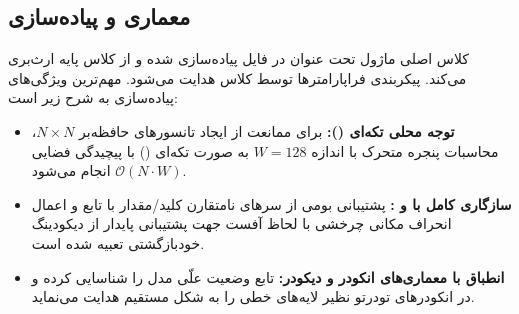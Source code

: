 \subsection{معماری و پیاده‌سازی}
کلاس اصلی ماژول تحت عنوان  در فایل  پیاده‌سازی شده و از کلاس پایه  ارث‌بری می‌کند. پیکربندی فراپارامترها توسط کلاس  هدایت می‌شود. مهم‌ترین ویژگی‌های پیاده‌سازی به شرح زیر است:
\begin{itemize}
    \item \textbf{توجه محلی تکه‌ای ():} برای ممانعت از ایجاد تانسورهای حافظه‌بر $N \times N$، محاسبات پنجره متحرک با اندازه $W=128$ به صورت تکه‌ای () با پیچیدگی فضایی $\mathcal{O}(N \cdot W)$ انجام می‌شود.
    \item \textbf{سازگاری کامل با  و :} پشتیبانی بومی از سرهای نامتقارن کلید/مقدار با تابع  و اعمال انحراف مکانی چرخشی با لحاظ آفست  جهت پشتیبانی پایدار از دیکودینگ خودبازگشتی تعبیه شده است.
    \item \textbf{انطباق با معماری‌های انکودر و دیکودر:} تابع  وضعیت علّی مدل را شناسایی کرده و در انکودرهای تودرتو نظیر  لایه‌های خطی را به شکل مستقیم هدایت می‌نماید.
\end{itemize}
